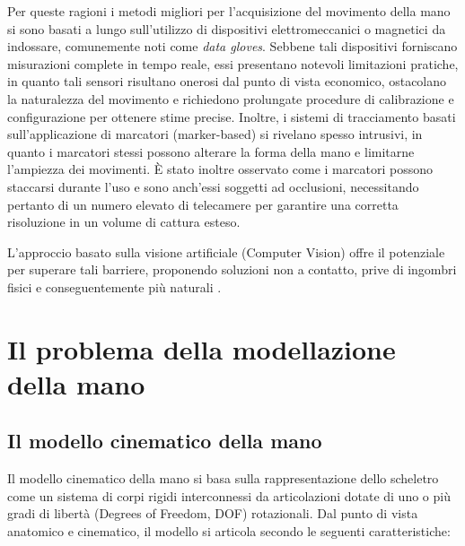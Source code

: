 Per queste ragioni i metodi migliori per l'acquisizione del movimento della mano si sono basati a lungo sull'utilizzo di dispositivi elettromeccanici o magnetici da indossare, comunemente noti come \emph{data gloves}.
Sebbene tali dispositivi forniscano misurazioni complete in tempo reale, essi presentano notevoli limitazioni pratiche, in quanto tali sensori risultano onerosi dal punto di vista economico, ostacolano la naturalezza del movimento e richiedono prolungate procedure di calibrazione e configurazione per ottenere stime precise.
Inoltre, i sistemi di tracciamento basati sull'applicazione di marcatori (marker-based) si rivelano spesso intrusivi, in quanto i marcatori stessi possono alterare la forma della mano e limitarne l'ampiezza dei movimenti.
È stato inoltre osservato come i marcatori possono staccarsi durante l'uso e sono anch'essi soggetti ad occlusioni, necessitando pertanto di un numero elevato di telecamere per garantire una corretta risoluzione in un volume di cattura esteso.

L'approccio basato sulla visione artificiale (Computer Vision) offre il potenziale per superare tali barriere, proponendo soluzioni non a contatto, prive di ingombri fisici e conseguentemente più naturali \cite{EROL200752}.


\section{Il problema della modellazione della mano}

\subsection{Il modello cinematico della mano}

Il modello cinematico della mano si basa sulla rappresentazione dello scheletro come un sistema di corpi rigidi interconnessi da articolazioni dotate di uno o più gradi di libertà (Degrees of Freedom, DOF) rotazionali.
Dal punto di vista anatomico e cinematico, il modello si articola secondo le seguenti caratteristiche:

